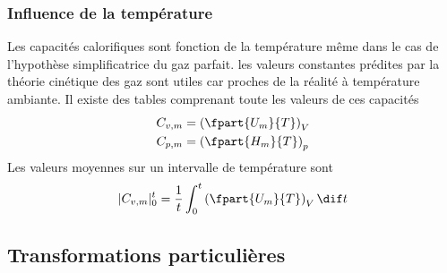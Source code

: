 \subsubsection{Influence de la température}
Les capacités calorifiques sont fonction de la température
même dans le cas de l'hypothèse simplificatrice du gaz parfait.
les valeurs constantes prédites par la théorie cinétique des gaz sont
utiles car proches de la réalité à température ambiante.
Il existe des tables comprenant toute les valeurs de ces capacités
\begin{align*}
C_{v,m} & = \left(\fpart{U_m}{T}\right )_V\\
C_{p,m} & = \left(\fpart{H_m}{T}\right )_p
\end{align*}
Les valeurs moyennes sur un intervalle de température sont
\[ |C_{v,m}|_0^t =
\frac 1t \int_0^t \left(\fpart{U_m}{T}\right )_V \dif t \]

\subsection{Transformations particulières}
